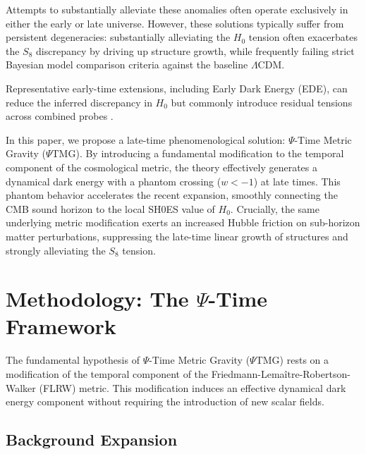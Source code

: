 \documentclass[10pt,twocolumn,secnumarabic,amssymb, nobibnotes, aps, prd, floatfix]{revtex4-2}
\providecommand{\texorpdfstring}[2]{#1}
\begin{document}
Attempts to substantially alleviate these anomalies often operate exclusively in either the early or late universe. However, these solutions typically suffer from persistent degeneracies: substantially alleviating the $H_0$ tension often exacerbates the $S_8$ discrepancy by driving up structure growth, while frequently failing strict Bayesian model comparison criteria against the baseline $\Lambda$CDM.

Representative early-time extensions, including Early Dark Energy (EDE), can reduce the inferred discrepancy in $H_0$ but commonly introduce residual tensions across combined probes \cite{Poulin2019EDE}.

In this paper, we propose a late-time phenomenological solution: $\Psi$-Time Metric Gravity ($\Psi$TMG). By introducing a fundamental modification to the temporal component of the cosmological metric, the theory effectively generates a dynamical dark energy with a phantom crossing ($w < -1$) at late times. This phantom behavior accelerates the recent expansion, smoothly connecting the CMB sound horizon to the local SH0ES value of $H_0$. Crucially, the same underlying metric modification exerts an increased Hubble friction on sub-horizon matter perturbations, suppressing the late-time linear growth of structures and strongly alleviating the $S_8$ tension.

\section{\texorpdfstring{Methodology: The $\Psi$-Time Framework}{Methodology: The Psi-Time Framework}}

The fundamental hypothesis of $\Psi$-Time Metric Gravity ($\Psi$TMG) rests on a modification of the temporal component of the Friedmann-Lema\^itre-Robertson-Walker (FLRW) metric. This modification induces an effective dynamical dark energy component without requiring the introduction of new scalar fields.

\subsection{Background Expansion}
\end{document}
